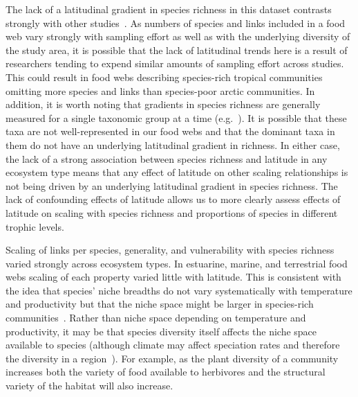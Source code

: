 \documentclass[12pt]{article}
\begin{document}
  The lack of a latitudinal gradient in species richness in this dataset contrasts
  strongly with other studies~\citep{Schemske2009,Macpherson2002,Kaufman1995}. As numbers of species and links included in a food web
  vary strongly with sampling effort as well as with the underlying diversity of the study
  area, it is possible that the lack of latitudinal trends here is a result of researchers
  tending to expend similar amounts of sampling effort across studies. This could result in
  food webs describing species-rich tropical communities omitting more species and links
  than species-poor arctic communities. In addition, it is worth noting that gradients in
  species richness are generally measured for a single taxonomic group at a time (e.g.~\citep{Kaufman1995}).
  It is possible that these taxa are not well-represented in our food webs and that the
  dominant taxa in them do not have an underlying latitudinal gradient in richness. 
  In either case, the lack of a strong association between
  species richness and latitude in any ecosystem type
  means that any effect of latitude on other scaling 
  relationships is not being driven by an underlying 
  latitudinal gradient in species richness.
  The lack of confounding effects of latitude allows us to 
  more clearly assess effects of latitude on scaling with 
  species richness and proportions of species in different 
  trophic levels.


  Scaling of links per species, generality, and vulnerability with species
  richness varied strongly across ecosystem types. In estuarine, marine, and
  terrestrial food webs scaling of each property varied little with latitude.
  This is consistent with the idea that species' niche breadths do not vary
  systematically with temperature and productivity but that the niche space
  might be larger in species-rich communities~\citep{Davies2007}. Rather than
  niche space depending on temperature and productivity, it may be that species
  diversity itself affects the niche space available to species (although climate
  may affect speciation rates and therefore the diversity in a region~\citep{Currie2004}). 
  For example, as the plant diversity of a community increases both the 
  variety of food available to herbivores and the structural variety of the habitat will also increase.
\end{document}
